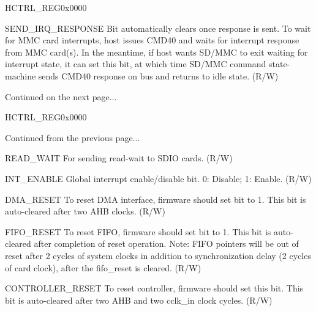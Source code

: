 \begin{register}{H}{CTRL\_REG}{0x0000}
\begin{regdesc}
\begin{reglist}
\item [SEND\_IRQ\_RESPONSE]Bit automatically clears once response is sent. To wait for MMC card interrupts, host issues CMD40 and waits for interrupt response from MMC card(s). In the meantime, if host wants SD/MMC to exit waiting for interrupt state, it can set this bit, at which time SD/MMC command state-machine sends CMD40 response on bus and returns to idle state. (R/W)
\item [Continued on the next page...]
\end{reglist}\end{regdesc}
\end{register}

\addtocounter{Regfloat}{-1}
\begin{register}{H}{CTRL\_REG}{0x0000}
\begin{regdesc}\begin{reglist}
\item [Continued from the previous page...]
\item [READ\_WAIT]For sending read-wait to SDIO cards. (R/W)
\item [INT\_ENABLE]Global interrupt enable/disable bit. 0: Disable; 1: Enable. (R/W)
\item [DMA\_RESET]To reset DMA interface, firmware should set bit to 1. This bit is auto-cleared after two AHB clocks. (R/W)
\item [FIFO\_RESET]To reset FIFO, firmware should set bit to 1. This bit is auto-cleared after completion of reset operation. Note: FIFO pointers will be out of reset after 2 cycles of system clocks in addition to synchronization delay (2 cycles of card clock), after the fifo\_reset is cleared. (R/W)
\item [CONTROLLER\_RESET]To reset controller, firmware should set this bit. This bit is auto-cleared after two AHB and two cclk\_in clock cycles. (R/W)
\end{reglist}\end{regdesc}
\end{register}

